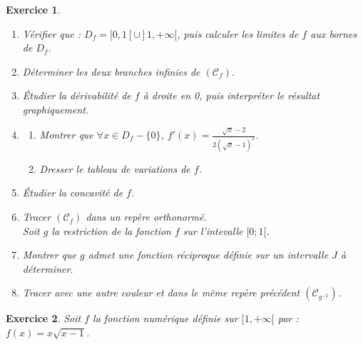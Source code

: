 \documentclass[12pt,a4paper]{article}
\theoremstyle{mystyle}
\newtheorem{exo}{Exercice}
\begin{document}
\begin{multicols*}{2}
\begin{exo}
\begin{enumerate}
    \item Vérifier que : $D_f = [0,1[ \cup ]1,+\infty[$, puis calculer les limites de $f$ aux bornes de $D_f$.
    \item Déterminer les deux branches infinies de $(\mathcal{C}_f)$.
    \item Étudier la dérivabilité de $f$ à droite en 0, puis interpréter le résultat graphiquement.
    \item 
    \begin{enumerate}
        \item Montrer que $\forall x \in D_f - \{0\}$, $f'(x) = \frac{\sqrt{x}-2}{2(\sqrt{x}-1)^2}$.
        \item Dresser le tableau de variations de $f$.
    \end{enumerate}
    	\item Étudier la concavité de $f$.
   \item Tracer $(\mathcal{C}_f)$ dans un repère orthonormé.\\
   Soit $g$ la restriction de la fonction $f$ sur l'intevalle $[0;1[$.
   \item Montrer que $g$ admet une fonction réciproque définie sur un intervalle $J$ à déterminer.
    \item Tracer avec une autre couleur et dans le même repère précédent $(\mathcal{C}_{g^{-1}})$.
\end{enumerate}

\end{exo}


\begin{exo}

Soit $f$ la fonction numérique définie sur $[1,+\infty[$ par : $f(x) = x \sqrt{x-1}$.


\end{exo}
\end{multicols*}
\end{document}
